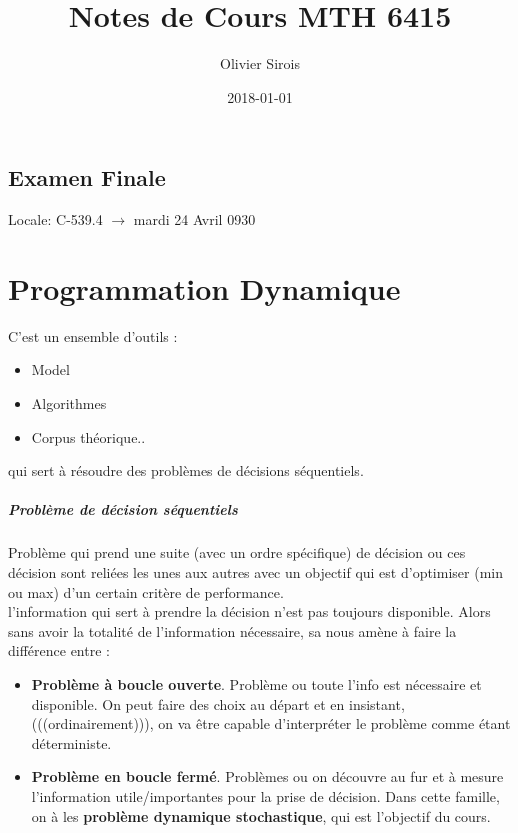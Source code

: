 \documentclass[oneside]{book}
\title{Notes de Cours MTH 6415}
\date{2018-01-01}
\author{Olivier Sirois}
\begin{document}
\setcounter{page}{1}
\maketitle
\tableofcontents


\section{Examen Finale}
Locale:  C-539.4 $\rightarrow$ mardi 24 Avril \@ 0930

\chapter{Programmation Dynamique}
C'est un ensemble d'outils :

\begin{itemize}
\item Model
\item Algorithmes
\item Corpus théorique..
\end{itemize}

qui sert à résoudre des problèmes de décisions séquentiels.
\paragraph{Problème de décision séquentiels} Problème qui prend une suite (avec un ordre spécifique) de décision ou ces décision sont reliées les unes aux autres avec un objectif qui est d'optimiser (min ou max) d'un certain critère de performance.\\

l'information qui sert à prendre la décision n'est pas toujours disponible. Alors sans avoir la totalité de l'information nécessaire, sa nous amène à faire la différence entre :

\begin{itemize}
\item \textbf{Problème à boucle ouverte}. Problème ou toute l'info est nécessaire et  disponible. On peut faire des choix au départ et en insistant, (((ordinairement))), on va être capable d'interpréter le problème comme étant déterministe.
\item \textbf{Problème en boucle fermé}. Problèmes ou on découvre au fur et à mesure l'information utile/importantes pour la prise de décision. Dans cette famille, on à les \textbf{problème dynamique stochastique}, qui est l'objectif du cours.
\end{itemize}
\end{document}
